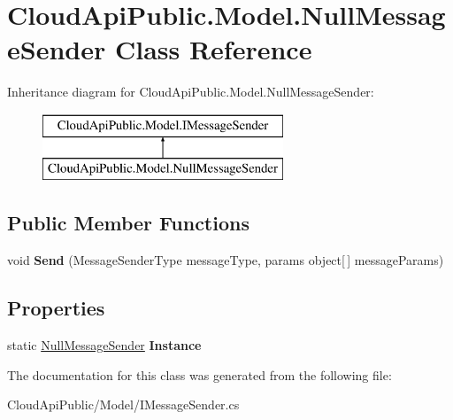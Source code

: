 \hypertarget{class_cloud_api_public_1_1_model_1_1_null_message_sender}{\section{Cloud\-Api\-Public.\-Model.\-Null\-Message\-Sender Class Reference}
\label{class_cloud_api_public_1_1_model_1_1_null_message_sender}
}
Inheritance diagram for Cloud\-Api\-Public.\-Model.\-Null\-Message\-Sender\-:\begin{figure}[H]
\begin{center}
\leavevmode
\includegraphics[height=2.000000cm]{class_cloud_api_public_1_1_model_1_1_null_message_sender}
\end{center}
\end{figure}
\subsection*{Public Member Functions}
\begin{DoxyCompactItemize}
\item 
\hypertarget{class_cloud_api_public_1_1_model_1_1_null_message_sender_aa1c4106bfc0c02f7b043d057b03cc7fd}{void {\bfseries Send} (Message\-Sender\-Type message\-Type, params object\mbox{[}$\,$\mbox{]} message\-Params)}\label{class_cloud_api_public_1_1_model_1_1_null_message_sender_aa1c4106bfc0c02f7b043d057b03cc7fd}

\end{DoxyCompactItemize}
\subsection*{Properties}
\begin{DoxyCompactItemize}
\item 
\hypertarget{class_cloud_api_public_1_1_model_1_1_null_message_sender_a3ef1dfef09cfd8c03c102db423700d3b}{static \hyperlink{class_cloud_api_public_1_1_model_1_1_null_message_sender}{Null\-Message\-Sender} {\bfseries Instance}}\label{class_cloud_api_public_1_1_model_1_1_null_message_sender_a3ef1dfef09cfd8c03c102db423700d3b}

\end{DoxyCompactItemize}


The documentation for this class was generated from the following file\-:\begin{DoxyCompactItemize}
\item 
Cloud\-Api\-Public/\-Model/I\-Message\-Sender.\-cs\end{DoxyCompactItemize}
